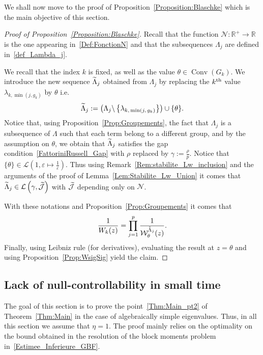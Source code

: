 \documentclass[10pt]{amsart}
\theoremstyle{definition}\newtheorem{defi}[theo]{Definition}\newtheorem{rema}[theo]{Remark}\newtheorem{exam}[theo]{Example}\newtheorem{exem}[theo]{Example}\newtheorem{nota}[theo]{Notation}
\DeclareMathOperator{\Conv}{Conv}
\newcommand{\n}{g}
\newcommand{\LL}{\mathcal{L}}
\newcommand{\R}{\mathbb{R}}
\let\oldtilde\tilde
\renewcommand*{\tilde}[1]{\mathchoice{\widetilde{#1}}{\widetilde{#1}}{\oldtilde{#1}}{\oldtilde{#1}}}\let\oldexists\exists
\renewcommand*{\exists}{\mathrel{\oldexists}}
\begin{document}
We shall now move to the proof of Proposition~\ref{Proposition:Blaschke} which is the main objective of this section.
\begin{proof}[Proof of Proposition~\ref{Proposition:Blaschke}]
Recall that the function $\mathcal{N} : \R^+ \to \R$ is the one appearing in~\eqref{Def:FonctionN} and that the subsequences $\Lambda_j$ are defined in~\eqref{def_Lambda_j}.

We recall that the index $k$ is fixed, as well as the value $\theta\in \Conv(G_k)$. We introduce the new sequence $\tilde{\Lambda}_j$ obtained from $\Lambda_j$ by replacing the $k^{\rm th}$ value $\lambda_{k,\min(j,\n_k)}$ by $\theta$ i.e.
\[
\tilde{\Lambda}_j := \left(\Lambda_j \backslash \left\{ \lambda_{k,\,\min(j,\,\n_k)} \right\} \right) \cup \{ \theta \}.
\]
Notice that, using Proposition~\ref{Prop:Groupements}, the fact that $\Lambda_j$ is a subsequence of $\Lambda$ such that each term belong to a different group, and by the assumption on $\theta$, we obtain that $\tilde{\Lambda}_j$ satisfies the gap condition~\eqref{FattoriniRussell_Gap} with $\rho$ replaced by $\gamma:=\frac{\rho}{p}$. Notice that $\{ \theta \} \in \LL \left(1, \varepsilon \mapsto \frac{1}{\varepsilon} \right)$. Thus using Remark~\ref{Rem:stabilite_Lw_inclusion} and the arguments of the proof of Lemma~\ref{Lem:Stabilite_Lw_Union} it comes that $\tilde{\Lambda}_j \in \mathcal{L}\left(\gamma,\tilde{\mathcal{J}}\right)$ with $\tilde{\mathcal{J}}$ depending only on $\mathcal{N}$.


With these notations and Proposition~\ref{Prop:Groupements} it comes that
\[
\frac{1}{W_k(z)} = \prod_{j=1}^p \frac{1}{\mathcal{W}^{\tilde{\Lambda}_j}_{\theta} (z)}.
\]
Finally, using Leibniz rule (for derivatives), evaluating the result at $z=\theta$ and using Proposition~\ref{Prop:WsigSig} yield the claim.
\end{proof}



\subsection{Lack of null-controllability in small time}\label{Sec:NonControlabilite}

The goal of this section is to prove the point~\eqref{Thm:Main_pt2} of Theorem~\ref{Thm:Main} in the case of algebraically simple eigenvalues. Thus, in all this section we assume that $\eta=1$. The proof mainly relies on the optimality on the bound obtained in the resolution of the block moments problem in~\eqref{Estimee_Inferieure_GBF}.
\end{document}

